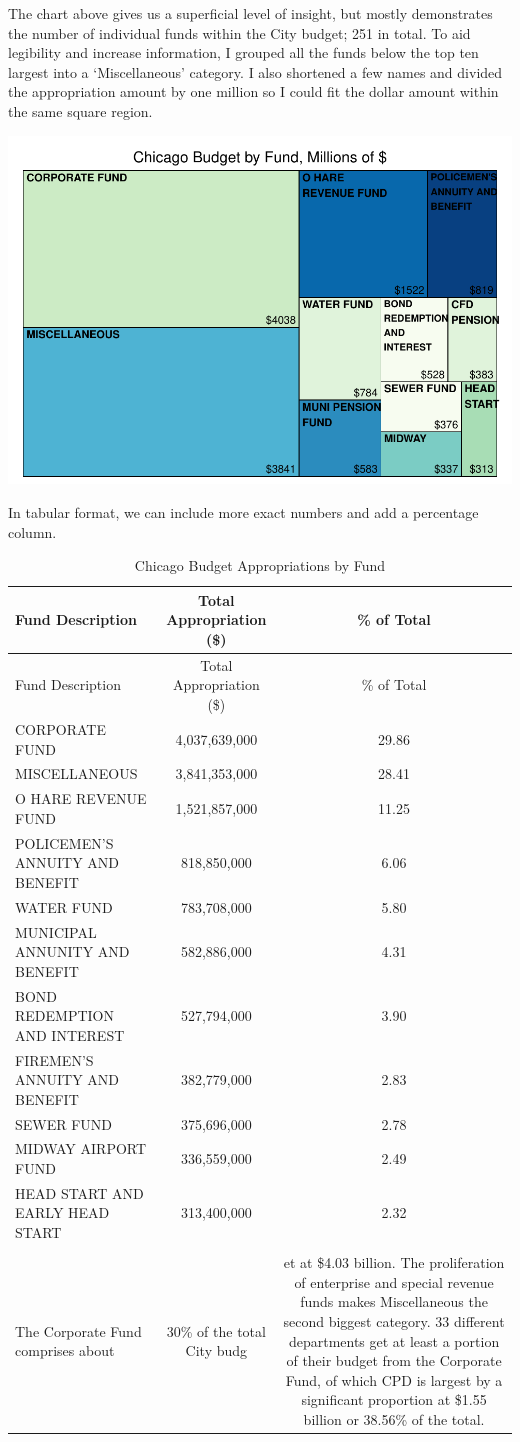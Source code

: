 \documentclass[
]{article}
\begin{document}
The chart above gives us a superficial level of insight, but mostly
demonstrates the number of individual funds within the City budget; 251
in total. To aid legibility and increase information, I grouped all the
funds below the top ten largest into a `Miscellaneous' category. I also
shortened a few names and divided the appropriation amount by one
million so I could fit the dollar amount within the same square region.

\begin{center}\includegraphics{cpd_budget_analysis_files/figure-latex/reduced budget treemap-1} \end{center}

In tabular format, we can include more exact numbers and add a
percentage column.

\begin{longtable}[]{@{}lcc@{}}
\caption{Chicago Budget Appropriations by Fund}\tabularnewline
\toprule
Fund Description & Total Appropriation (\$) & \% of Total\tabularnewline
\midrule
\endfirsthead
\toprule
Fund Description & Total Appropriation (\$) & \% of Total\tabularnewline
\midrule
\endhead
CORPORATE FUND & 4,037,639,000 & 29.86\tabularnewline
MISCELLANEOUS & 3,841,353,000 & 28.41\tabularnewline
O HARE REVENUE FUND & 1,521,857,000 & 11.25\tabularnewline
POLICEMEN'S ANNUITY AND BENEFIT & 818,850,000 & 6.06\tabularnewline
WATER FUND & 783,708,000 & 5.80\tabularnewline
MUNICIPAL ANNUNITY AND BENEFIT & 582,886,000 & 4.31\tabularnewline
BOND REDEMPTION AND INTEREST & 527,794,000 & 3.90\tabularnewline
FIREMEN'S ANNUITY AND BENEFIT & 382,779,000 & 2.83\tabularnewline
SEWER FUND & 375,696,000 & 2.78\tabularnewline
MIDWAY AIRPORT FUND & 336,559,000 & 2.49\tabularnewline
HEAD START AND EARLY HEAD START & 313,400,000 & 2.32\tabularnewline
\setlength{\parindent}{5ex} & &\tabularnewline
The Corporate Fund comprises about & 30\% of the total City budg & et at
\$4.03 billion. The proliferation of enterprise and special revenue
funds makes Miscellaneous the second biggest category. 33 different
departments get at least a portion of their budget from the Corporate
Fund, of which CPD is largest by a significant proportion at \$1.55
billion or 38.56\% of the total.\tabularnewline
\bottomrule
\end{longtable}
\end{document}
